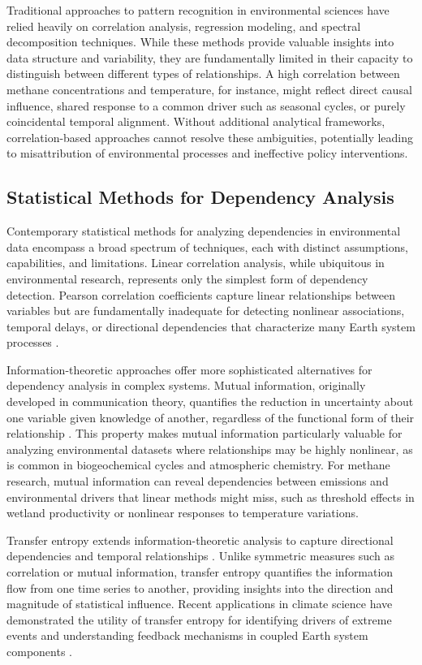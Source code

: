 Traditional approaches to pattern recognition in environmental sciences have relied heavily on correlation analysis, regression modeling, and spectral decomposition techniques. While these methods provide valuable insights into data structure and variability, they are fundamentally limited in their capacity to distinguish between different types of relationships. A high correlation between methane concentrations and temperature, for instance, might reflect direct causal influence, shared response to a common driver such as seasonal cycles, or purely coincidental temporal alignment. Without additional analytical frameworks, correlation-based approaches cannot resolve these ambiguities, potentially leading to misattribution of environmental processes and ineffective policy interventions.

\subsection{Statistical Methods for Dependency Analysis}

Contemporary statistical methods for analyzing dependencies in environmental data encompass a broad spectrum of techniques, each with distinct assumptions, capabilities, and limitations. Linear correlation analysis, while ubiquitous in environmental research, represents only the simplest form of dependency detection. Pearson correlation coefficients capture linear relationships between variables but are fundamentally inadequate for detecting nonlinear associations, temporal delays, or directional dependencies that characterize many Earth system processes \cite{Kraskov2004}.

Information-theoretic approaches offer more sophisticated alternatives for dependency analysis in complex systems. Mutual information, originally developed in communication theory, quantifies the reduction in uncertainty about one variable given knowledge of another, regardless of the functional form of their relationship \cite{Kraskov2004}. This property makes mutual information particularly valuable for analyzing environmental datasets where relationships may be highly nonlinear, as is common in biogeochemical cycles and atmospheric chemistry. For methane research, mutual information can reveal dependencies between emissions and environmental drivers that linear methods might miss, such as threshold effects in wetland productivity or nonlinear responses to temperature variations.

Transfer entropy extends information-theoretic analysis to capture directional dependencies and temporal relationships \cite{Schreiber2000}. Unlike symmetric measures such as correlation or mutual information, transfer entropy quantifies the information flow from one time series to another, providing insights into the direction and magnitude of statistical influence. Recent applications in climate science have demonstrated the utility of transfer entropy for identifying drivers of extreme events and understanding feedback mechanisms in coupled Earth system components \cite{Palus2024, li_integrating_2025}.

